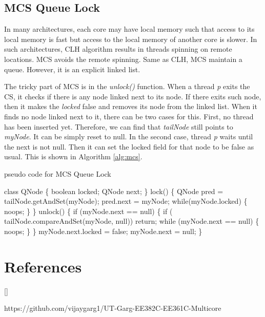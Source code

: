 \documentclass[twoside]{article}
\def\beginrefs{\begin{list}%
        {[\arabic{equation}]}{\usecounter{equation}
         \setlength{\leftmargin}{2.0truecm}\setlength{\labelsep}{0.4truecm}%
         \setlength{\labelwidth}{1.6truecm}}}
\def\endrefs{\end{list}}
\def\bibentry#1{\item[\hbox{[#1]}]}
\begin{document}
\subsection{MCS Queue Lock}

In many architectures, each core may have local memory such that access to its local memory is fast but access to the local memory of another core is slower. In such architectures, CLH algorithm results in threads spinning on remote locations. MCS avoids the remote spinning. Same as CLH, MCS maintain a queue. However, it is an explicit linked list. 

The tricky part of MCS is in the \textit{unlock()} function. When a thread \textit{p} exits the CS, it checks if there is any node linked next to its node. If there exits such node, then it makes the \textit{locked} false and removes its node from the linked list. When it finds no node linked next to it, there can be two cases for this. First, no thread has been inserted yet. Therefore, we can find that \textit{tailNode} still points to \textit{myNode}. It can be simply reset to null. In the second case, thread \textit{p} waits until the next is not null. Then it can set the locked field for that node to be false as usual. This is shown in Algorithm \ref{alg:mcs}.

\begin{algorithm}
\caption{pseudo code for MCS Queue Lock}
\begin{algorithmic}[1]
\State class QNode \{
\State \indent boolean locked; 
\State \indent QNode next; 
\State \}
\State lock() \{
\State \indent QNode pred = tailNode.getAndSet(myNode);
\State \indent pred.next = myNode; 
\State \indent while(myNode.locked) \{ noops; \}
\State \}
\State unlock() \{
\State \indent if (myNode.next == null) \{
\State \indent \indent if ( tailNode.compareAndSet(myNode, null)) return;
\State \indent \indent while (myNode.next == null) \{ noops; \}
\State \indent \}
\State \indent myNode.next.locked = false;
\State \indent myNode.next = null;
\State \}
\end{algorithmic}
\label{alg:mcs}
\end{algorithm}


\section*{References}
\beginrefs
\bibentry{1} https://github.com/vijaygarg1/UT-Garg-EE382C-EE361C-Multicore
\endrefs
\end{document}
